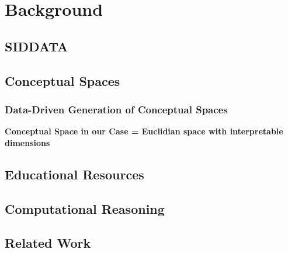 \chapter{Background}



\section{SIDDATA}


\section{Conceptual Spaces}


\subsection{Data-Driven Generation of Conceptual Spaces}


\textbf{Conceptual Space in our Case = Euclidian space with interpretable dimensions}


\section{Educational Resources}



\section{Computational Reasoning}

\label{sec:reasoning}



\section{Related Work}
\label{sec:otherwork}



